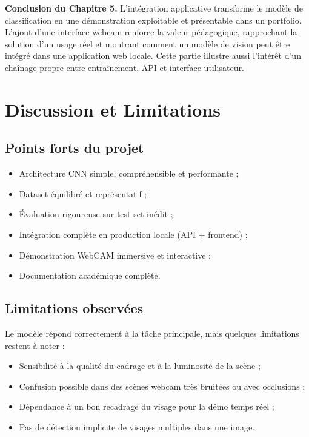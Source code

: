 \documentclass[11pt,a4paper]{article}
\begin{document}
\textbf{Conclusion du Chapitre 5.} L'intégration applicative transforme le modèle de classification en une démonstration exploitable et présentable dans un portfolio. L'ajout d'une interface webcam renforce la valeur pédagogique, rapprochant la solution d'un usage réel et montrant comment un modèle de vision peut être intégré dans une application web locale. Cette partie illustre aussi l'intérêt d'un chaînage propre entre entraînement, API et interface utilisateur.

\newpage
\section{Discussion et Limitations}

\subsection{Points forts du projet}

\begin{itemize}
    \item Architecture CNN simple, compréhensible et performante ;
    \item Dataset équilibré et représentatif ;
    \item Évaluation rigoureuse sur test set inédit ;
    \item Intégration complète en production locale (API + frontend) ;
    \item Démonstration WebCAM immersive et interactive ;
    \item Documentation académique complète.
\end{itemize}

\subsection{Limitations observées}

Le modèle répond correctement à la tâche principale, mais quelques limitations restent à noter :
\begin{itemize}
    \item Sensibilité à la qualité du cadrage et à la luminosité de la scène ;
    \item Confusion possible dans des scènes webcam très bruitées ou avec occlusions ;
    \item Dépendance à un bon recadrage du visage pour la démo temps réel ;
    \item Pas de détection implicite de visages multiples dans une image.
\end{itemize}
\end{document}
